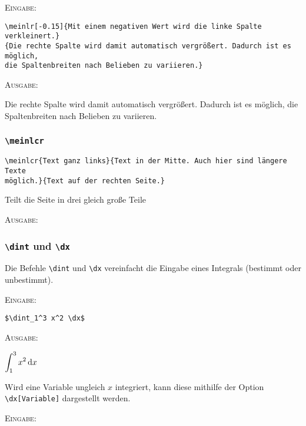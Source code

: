\documentclass[a4paper,12pt]{article}
\begin{document}
\textsc{Eingabe:}

\begin{verbatim}
\meinlr[-0.15]{Mit einem negativen Wert wird die linke Spalte verkleinert.}
{Die rechte Spalte wird damit automatisch vergrößert. Dadurch ist es möglich, 
die Spaltenbreiten nach Belieben zu variieren.}
\end{verbatim}

\textsc{Ausgabe:}

{Die rechte Spalte wird damit automatisch vergrößert. Dadurch ist es möglich, 
die Spaltenbreiten nach Belieben zu variieren.}

\leer

\subsubsection{\texttt{\textbackslash meinlcr}}
\begin{verbatim}
\meinlcr{Text ganz links}{Text in der Mitte. Auch hier sind längere Texte
möglich.}{Text auf der rechten Seite.}
\end{verbatim}
Teilt die Seite in drei gleich große Teile

\leer

\textsc{Ausgabe:}



\subsubsection{\texttt{\textbackslash dint} und \texttt{\textbackslash dx}}
Die Befehle \texttt{\textbackslash dint} und \texttt{\textbackslash dx} vereinfacht die Eingabe eines Integrals (bestimmt oder unbestimmt).\leer

\textsc{Eingabe:}

\begin{verbatim}
$\dint_1^3 x^2 \dx$ 
\end{verbatim}

\textsc{Ausgabe:}\leer

$\displaystyle\int_1^3 x^2 \,\text{d}x$ 
\leer

Wird eine Variable ungleich $x$ integriert, kann diese mithilfe der Option \texttt{\textbackslash{dx[Variable]}} dargestellt werden.\leer

\textsc{Eingabe:}
\end{document}
